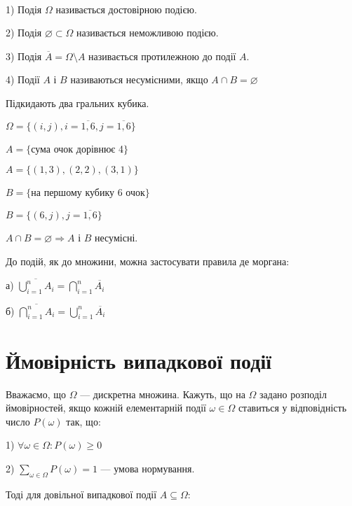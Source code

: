 \begin{definition}~\par
    1) Подія $\Omega$ називається достовірною подією.
    
    2) Подія $\varnothing \subset \Omega$ називається неможливою
    подією.

    3) Подія $\overline{A} = \Omega \setminus A$ називається
    протилежною до події $A$.

    4) Події $A$ і $B$ називаються несумісними, якщо
    $A \cap B = \varnothing$
\end{definition}

\begin{example}
    Підкидають два гральних кубика.

    $\Omega = \{(i,j), i=\overline{1,6}, j=\overline{1,6}\}$

    $A = \{$сума очок дорівнює 4$\}$

    $A = \{(1,3), (2,2), (3,1)\}$

    $B = \{$на першому кубику 6 очок$\}$

    $B = \{(6,j), j = \overline{1,6}\}$

    $A \cap B = \varnothing \Rightarrow A$ і $B$ несумісні.
\end{example}

\begin{remark}
    До подій, як до множини, можна застосувати правила де
    моргана:

    а) $\overline{\bigcup\limits_{i=1}^n A_i}
    = \bigcap\limits_{i=1}^n \overline{A_i}$

    б) $\overline{\bigcap\limits_{i=1}^n A_i}
    = \bigcup\limits_{i=1}^n \overline{A_i}$
\end{remark}

\section{Ймовірність випадкової події}

Вважаємо, що $\Omega$ --- дискретна множина. Кажуть, що на 
$\Omega$ задано розподіл ймовірностей, якщо кожній елементарній
події $\omega \in \Omega$ ставиться у відповідність число
$P(\omega)$ так, що:

1) $\forall \omega \in \Omega: P(\omega) \geqslant 0$

2) $\sum\limits_{\omega \in \Omega} P(\omega) = 1$ --- умова
нормування.

Тоді для довільної випадкової події $A \subseteq \Omega:$

